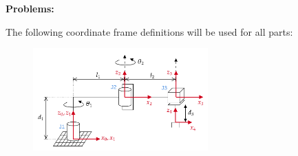 \documentclass[10pt]{article}
\begin{document}
\textbf{Problems:}

The following coordinate frame definitions will be used for all parts:

\begin{figure}[H]
	\centering
	\includegraphics[width=0.6\textwidth]{figures/rrp_manipulator_reference_frames.png}
\end{figure}
\end{document}
